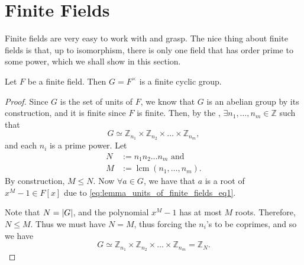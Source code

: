 \documentclass[notoc,notitlepage,nobib]{tufte-book}
\DeclareMathOperator{\lcm}{lcm}
\begin{document}
\section{Finite Fields}%
\label{sec:finite_fields}

Finite fields are very easy to work with and grasp. The nice thing about finite fields is
that, up to isomorphism, there is only one field that has order prime to some power, which
we shall show in this section.

\begin{lemma}\label{lemma:units_of_a_finite_field_form_a_finite_cyclic_group}
  Let $F$ be a finite field. Then $G = F^\times$ is a finite cyclic group.
\end{lemma}

\begin{proof}
  Since $G$ is the set of units of $F$, we know that $G$ is an abelian group by its
  construction, and it is finite since $F$ is finite. Then, by the , $\exists n_1, \ldots, n_m \in \mathbb{Z}$ such that
  \begin{equation}\label{eq:lemma_units_of_finite_fields_eq1}
    G \simeq \mathbb{Z}_{n_1} \times \mathbb{Z}_{n_2} \times \hdots \times
    \mathbb{Z}_{n_m},
  \end{equation}
  and each $n_i$ is a prime power. Let
  \begin{align*}
    N &:= n_1 n_2 \hdots n_m \text{ and } \\
    M &:= \lcm(n_1, \ldots, n_m).
  \end{align*}
  By construction, $M \leq N$. Now $\forall a \in G$, we have that $a$ is a root of $x^M -
  1 \in F[x]$ due to \cref{eq:lemma_units_of_finite_fields_eq1}.
  
  Note that $N = \left|G\right|$, and the polynomial $x^M - 1$ has at most $M$ roots. Therefore,
  $N \leq M$. Thus we must have $N = M$, thus forcing the $n_i$'s to be coprimes, and so
  we have
  \begin{equation*}
    G \simeq \mathbb{Z}_{n_1} \times \mathbb{Z}_{n_2} \times \hdots \times
    \mathbb{Z}_{n_m} = \mathbb{Z}_N.
  \end{equation*}
\end{proof}
\end{document}
